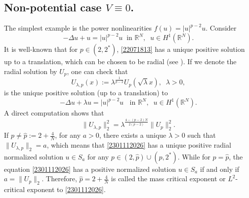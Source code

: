 \documentclass[10pt]{article}
\numberwithin{equation}{section}
\numberwithin{equation}{section}
\begin{document}
\subsection{Non-potential case $V\equiv 0$.} The simplest example is the power nonlinearities $f(u)=|u|^{p-2}u$. Consider
\begin{equation}\label{22071813}
    -\Delta u+u= |u|^{p-2}u~\text { in } \mathbb{R}^N, \;\; u\in H^1(\mathbb{R}^N).
\end{equation}
It is well-known that for $p\in (2,2^*)$, \eqref{22071813} has a unique positive solution up to a translation, which can be chosen to be radial (see \cite{Kong1989}). If we denote the radial solution by $U_p$, one can check that
\[
U_{\lambda, p}(x):=\lambda^{\frac{1}{p-2}}U_p({\sqrt{\lambda}}x),\;\; \lambda>0,
\]
is the unique positive solution (up to a translation) to
\begin{equation}\label{2301112026}
-\Delta u+\lambda u= |u|^{p-2}u\;\;\text { in } \mathbb{R}^N, \;\; u\in H^1(\mathbb{R}^N).
\end{equation}
A direct computation shows that
\[
\|U_{\lambda, p}\|_2^2=\lambda^{\frac{4-(p-2)N}{2(p-2)}}\|U_p\|_2^2.
\]
If $p\neq \hat{p}:=2+\frac{4}{N}$, for any $a>0$, there exists a unique $\lambda>0$ such that $\|U_{\lambda, p}\|_2=a$, which means that \eqref{2301112026}
has a unique positive radial normalized solution $u\in S_a$ for any $p\in (2, \hat{p})\cup (\hat{p}, 2^*)$.
While for $p=\hat{p}$, the equation \eqref{2301112026} has a positive normalized solution $u\in S_a$ if and only if $a=\|U_p\|_2$. Therefore, $\hat{p}=2+\frac{4}{N}$ is called the mass critical exponent or $L^2$-critical exponent to \eqref{2301112026}.
\end{document}
